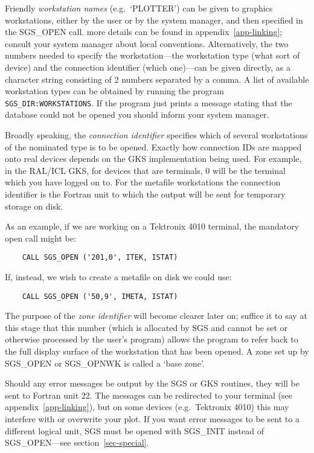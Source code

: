 Friendly {\em workstation names} (e.g.\ `PLOTTER') can be given to graphics
workstations, either by the user or by the system manager, and then specified
in the SGS\_OPEN call.
more details can be found in appendix~\ref{app-linking}; consult your 
system manager about local conventions.                                     
Alternatively, the two numbers needed to specify the workstation---the
workstation type (what sort of device) and the connection identifier (which 
one)---can be given directly, as a character string consisting of 2 numbers
separated by a comma.
A list of available workstation types can be obtained by running the program
{\tt SGS\_DIR:WORKSTATIONS}. 
If the program just prints a message stating
that the database could not be opened you should inform your system manager.

Broadly speaking, the {\em connection identifier} specifies which of several
workstations of the nominated type is to be opened.
Exactly how connection IDs are mapped onto real devices depends on the GKS
implementation being used.
For example, in the RAL/ICL GKS, for devices that are terminals, 0 will be the
terminal which you have logged on to.
For the metafile workstations the connection identifier is the Fortran unit to
which the output will be sent for temporary storage on disk.

As an example, if we are working on a Tektronix 4010 terminal, the mandatory
open call might be:
\begin{verbatim}
    CALL SGS_OPEN ('201,0', ITEK, ISTAT)
\end{verbatim}
If, instead, we wish to create a metafile on disk we could use:
\begin{verbatim}
    CALL SGS_OPEN ('50,9', IMETA, ISTAT)
\end{verbatim}

The purpose of the {\em zone identifier} will become clearer later on; suffice
it to say at this stage that this number (which is allocated by SGS and cannot
be set or otherwise processed by the user's program) allows the program to refer
back to the full display surface of the workstation that has been opened.
A zone set up by SGS\_OPEN or SGS\_OPNWK is called a `base zone'.

Should any error messages be output by the SGS or GKS routines, they will be
sent to Fortran unit 22.
The messages can be redirected to your terminal 
(see appendix~\ref{app-linking}), but on some
devices (e.g.\ Tektronix 4010) this may interfere with or overwrite your plot.
If you want error messages to be sent to a different logical unit, SGS must
be opened with SGS\_INIT instead of SGS\_OPEN---see section~\ref{sec-special}.

